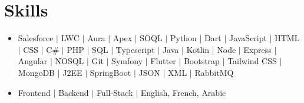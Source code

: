 \documentclass[a4paper,12pt]{article}
\begin{document}
\section{Skills}
\begin{itemize}
\item \normalsize{Salesforce $\vert$ LWC $\vert$ Aura $\vert$ Apex $\vert$ SOQL $\vert$ Python $\vert$ Dart $\vert$ JavaScript $\vert$ HTML $\vert$ CSS $\vert$ C\# $\vert$ PHP $\vert$ SQL  $\vert$ Typescript $\vert$ Java $\vert$ Kotlin $\vert$ Node $\vert$ Express $\vert$ Angular $\vert$ NOSQL $\vert$ Git $\vert$ Symfony $\vert$ Flutter $\vert$ Bootstrap $\vert$ Tailwind CSS $\vert$ MongoDB $\vert$ J2EE $\vert$ SpringBoot $\vert$ JSON $\vert$ XML $\vert$ RabbitMQ}\\
\item \normalsize{Frontend $\vert$ Backend $\vert$ Full-Stack $\vert$ English, French, Arabic}\\
\end{itemize}



\vfill
{}
\end{document}

